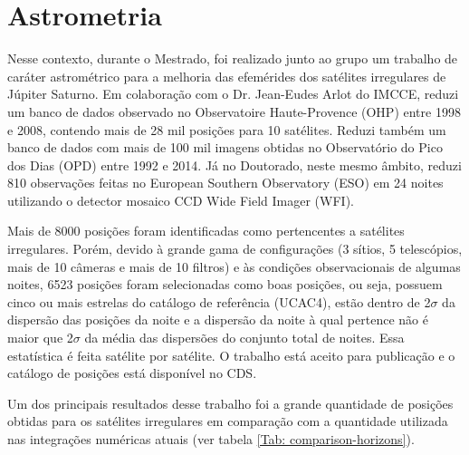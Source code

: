 \documentclass[12pt,a4paper]{monografia}
\begin{document}
\section{Astrometria}
\label{Sec: Irr-astrometria}

Nesse contexto, durante o Mestrado, foi realizado junto ao grupo um trabalho de caráter astrométrico para a melhoria das efemérides dos satélites irregulares de Júpiter Saturno. Em colaboração com o Dr. Jean-Eudes Arlot do IMCCE, reduzi um banco de dados observado no Observatoire Haute-Provence (OHP) entre 1998 e 2008, contendo mais de 28 mil posições para 10 satélites. Reduzi também um banco de dados com mais de 100 mil imagens obtidas no Observatório do Pico dos Dias (OPD) entre 1992 e 2014. Já no Doutorado, neste mesmo âmbito, reduzi 810 observações feitas no European Southern Observatory (ESO) em 24 noites utilizando o detector mosaico CCD Wide Field Imager (WFI).

Mais de 8000 posições foram identificadas como pertencentes a satélites irregulares. Porém, devido à grande gama de configurações (3 sítios, 5 telescópios, mais de 10 câmeras e mais de 10 filtros) e às condições observacionais de algumas noites, 6523 posições foram selecionadas como boas posições, ou seja, possuem cinco ou mais estrelas do catálogo de referência (UCAC4), estão dentro de 2$\sigma$ da dispersão das posições da noite e a dispersão da noite à qual pertence não é maior que 2$\sigma$ da média das dispersões do conjunto total de noites. Essa estatística é feita satélite por satélite. O trabalho está aceito para publicação \citep{GomesJunior2015-Irregular} e o catálogo de posições está disponível no CDS.

Um dos principais resultados desse trabalho foi a grande quantidade de posições obtidas para os satélites irregulares em comparação com a quantidade utilizada nas integrações numéricas atuais (ver tabela \ref{Tab: comparison-horizons}).
\end{document}
